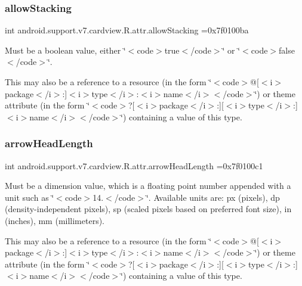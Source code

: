 \subsubsection{\texorpdfstring{allow\+Stacking}{allowStacking}}
{\footnotesize\ttfamily int android.\+support.\+v7.\+cardview.\+R.\+attr.\+allow\+Stacking =0x7f0100ba\hspace{0.3cm}{\ttfamily [static]}}

Must be a boolean value, either \char`\"{}$<$code$>$true$<$/code$>$\char`\"{} or \char`\"{}$<$code$>$false$<$/code$>$\char`\"{}. 

This may also be a reference to a resource (in the form \char`\"{}$<$code$>$@\mbox{[}$<$i$>$package$<$/i$>$\+:\mbox{]}$<$i$>$type$<$/i$>$\+:$<$i$>$name$<$/i$>$$<$/code$>$\char`\"{}) or theme attribute (in the form \char`\"{}$<$code$>$?\mbox{[}$<$i$>$package$<$/i$>$\+:\mbox{]}\mbox{[}$<$i$>$type$<$/i$>$\+:\mbox{]}$<$i$>$name$<$/i$>$$<$/code$>$\char`\"{}) containing a value of this type. \mbox{\label{classandroid_1_1support_1_1v7_1_1cardview_1_1R_1_1attr_af325e0a81cb3c1eee00b490c7ae7b45d}} 
\subsubsection{\texorpdfstring{arrow\+Head\+Length}{arrowHeadLength}}
{\footnotesize\ttfamily int android.\+support.\+v7.\+cardview.\+R.\+attr.\+arrow\+Head\+Length =0x7f0100c1\hspace{0.3cm}{\ttfamily [static]}}

Must be a dimension value, which is a floating point number appended with a unit such as \char`\"{}$<$code$>$14.\+5sp$<$/code$>$\char`\"{}. Available units are\+: px (pixels), dp (density-\/independent pixels), sp (scaled pixels based on preferred font size), in (inches), mm (millimeters). 

This may also be a reference to a resource (in the form \char`\"{}$<$code$>$@\mbox{[}$<$i$>$package$<$/i$>$\+:\mbox{]}$<$i$>$type$<$/i$>$\+:$<$i$>$name$<$/i$>$$<$/code$>$\char`\"{}) or theme attribute (in the form \char`\"{}$<$code$>$?\mbox{[}$<$i$>$package$<$/i$>$\+:\mbox{]}\mbox{[}$<$i$>$type$<$/i$>$\+:\mbox{]}$<$i$>$name$<$/i$>$$<$/code$>$\char`\"{}) containing a value of this type. \mbox{\label{classandroid_1_1support_1_1v7_1_1cardview_1_1R_1_1attr_a3926af148e58c48e553b14e8f44e2b7f}} 
